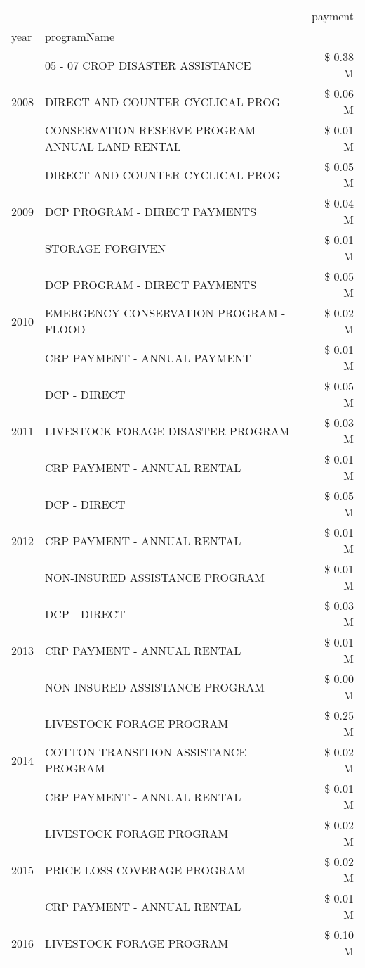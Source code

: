 \begin{tabular}{llr}
\toprule
 &  & payment \\
year & programName &  \\
\midrule
\multirow[t]{3}{*}{2008} & 05 - 07 CROP DISASTER ASSISTANCE & \$ 0.38 M \\
 & DIRECT AND COUNTER CYCLICAL PROG & \$ 0.06 M \\
 & CONSERVATION RESERVE PROGRAM - ANNUAL LAND RENTAL & \$ 0.01 M \\
\cline{1-3}
\multirow[t]{3}{*}{2009} & DIRECT AND COUNTER CYCLICAL PROG & \$ 0.05 M \\
 & DCP PROGRAM - DIRECT PAYMENTS & \$ 0.04 M \\
 & STORAGE FORGIVEN & \$ 0.01 M \\
\cline{1-3}
\multirow[t]{3}{*}{2010} & DCP PROGRAM - DIRECT PAYMENTS & \$ 0.05 M \\
 & EMERGENCY CONSERVATION PROGRAM - FLOOD & \$ 0.02 M \\
 & CRP PAYMENT - ANNUAL PAYMENT & \$ 0.01 M \\
\cline{1-3}
\multirow[t]{3}{*}{2011} & DCP - DIRECT & \$ 0.05 M \\
 & LIVESTOCK FORAGE DISASTER PROGRAM & \$ 0.03 M \\
 & CRP PAYMENT - ANNUAL RENTAL & \$ 0.01 M \\
\cline{1-3}
\multirow[t]{3}{*}{2012} & DCP - DIRECT & \$ 0.05 M \\
 & CRP PAYMENT - ANNUAL RENTAL & \$ 0.01 M \\
 & NON-INSURED ASSISTANCE PROGRAM & \$ 0.01 M \\
\cline{1-3}
\multirow[t]{3}{*}{2013} & DCP - DIRECT & \$ 0.03 M \\
 & CRP PAYMENT - ANNUAL RENTAL & \$ 0.01 M \\
 & NON-INSURED ASSISTANCE PROGRAM & \$ 0.00 M \\
\cline{1-3}
\multirow[t]{3}{*}{2014} & LIVESTOCK FORAGE PROGRAM & \$ 0.25 M \\
 & COTTON TRANSITION ASSISTANCE PROGRAM & \$ 0.02 M \\
 & CRP PAYMENT - ANNUAL RENTAL & \$ 0.01 M \\
\cline{1-3}
\multirow[t]{3}{*}{2015} & LIVESTOCK FORAGE PROGRAM & \$ 0.02 M \\
 & PRICE LOSS COVERAGE PROGRAM & \$ 0.02 M \\
 & CRP PAYMENT - ANNUAL RENTAL & \$ 0.01 M \\
\cline{1-3}
\multirow[t]{3}{*}{2016} & LIVESTOCK FORAGE PROGRAM                      & \$ 0.10 M \\

\end{tabular}
